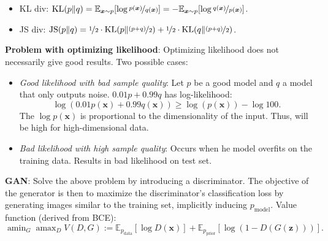 \documentclass{article}
\DeclareMathOperator*{\argmax}{amax}
\DeclareMathOperator*{\argmin}{amin}
\newcommand{\lft}{\mathopen{}\mathclose\bgroup\left}
\newcommand{\rgt}{\aftergroup\egroup\right}
\newcommand{\E}{\mathbb{E}}
\renewcommand{\vec}[1]{\bm{#1}}
\newenvironment{topic}[1]
{\textbf{\sffamily \colorbox{black}{\rlap{\textbf{\textcolor{white}{#1}}}\hspace{\linewidth}\hspace{-2\fboxsep}}} \\ \vspace{0.2cm}}
{}
\begin{document}
\begin{multicols*}{2}
\begin{topic}{Normalizing flow}
    \end{topic}

    \begin{topic}{Generative adversarial network}

        \begin{itemize}
            \item KL div: $\mathrm{KL}(p \lVert q) = \E_{\vec{x} \sim p} \lft[ \log \nicefrac{p(\vec{x})}{q(\vec{x})}
                          \rgt] = - \E_{\vec{x} \sim p} \lft[ \log \nicefrac{q(\vec{x})}{p(\vec{x})} \rgt]$.
            \item JS div: $\mathrm{JS}(p \lVert q) = \nicefrac{1}{2} \cdot \mathrm{KL}\lft(p \middle\lVert
                      \nicefrac{(p + q)}{2} \rgt) + \nicefrac{1}{2} \cdot \mathrm{KL}\lft( q \middle\lVert \nicefrac{(p +
                              q)}{2} \rgt)$.
        \end{itemize}

        \textbf{Problem with optimizing likelihood}: Optimizing likelihood does not necessarily give good results. Two possible cases:
        \begin{itemize}
            \item \textit{Good likelihood with bad sample quality}: Let $p$ be a good model and $q$ a model that only outputs
                  noise. $0.01p + 0.99q$ has log-likelihood: \[
                      \log(0.01p(\vec{x}) + 0.99q(\vec{x})) \geq \log(p(\vec{x})) - \log 100.
                  \]
                  The $\log p(\vec{x})$ is proportional to the dimensionality of the input. Thus, will be high for
                  high-dimensional data.

            \item \textit{Bad likelihood with high sample quality}: Occurs when he model overfits on the training data.
                  Results in bad likelihood on test set.

        \end{itemize}

        \textbf{GAN}: Solve the above problem by introducing a discriminator. The objective of the
        generator is then to maximize the discriminator's classification loss by generating images
        similar to the training set, implicitly inducing $p_{\mathrm{model}}$. Value function (derived from BCE): \[
            \argmin\nolimits_{G} \argmax\nolimits_{D} V(D, G) := \E_{p_{\mathrm{data}}}[\log D(\vec{x})] + \E_{p_{\mathrm{prior}}} [\log (1 - D(G(\vec{z})))].
        \]


\end{topic}
\end{multicols*}
\end{document}
